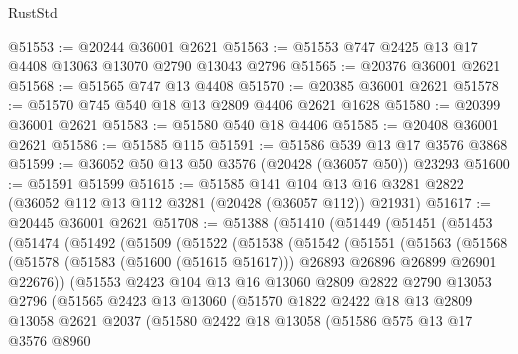 \begin{lexlean}{RustStd}
\begin{coremodule}
@51553 := @20244 @36001 @2621
@51563 := @51553 @747 @2425 @13 @17 @4408 @13063 @13070 @2790 @13043 @2796
@51565 := @20376 @36001 @2621
@51568 := @51565 @747 @13 @4408
@51570 := @20385 @36001 @2621
@51578 := @51570 @745 @540 @18 @13 @2809 @4406 @2621 @1628
@51580 := @20399 @36001 @2621
@51583 := @51580 @540 @18 @4406
@51585 := @20408 @36001 @2621
@51586 := @51585 @115
@51591 := @51586 @539 @13 @17 @3576 @3868
@51599 := @36052 @50 @13 @50 @3576 (@20428 (@36057 @50)) @23293
@51600 := @51591 @51599
@51615 := @51585
    @141
    @104
    @13
    @16
    @3281
    @2822
    (@36052 @112 @13 @112 @3281 (@20428 (@36057 @112)) @21931)
@51617 := @20445 @36001 @2621
@51708 := @51388
    (@51410
      (@51449
        (@51451
          (@51453
            (@51474
              (@51492
                (@51509
                  (@51522
                    (@51538
                      (@51542
                        (@51551
                          (@51563
                            (@51568
                              (@51578
                                (@51583 (@51600 (@51615 @51617)))
                                @26893
                                @26896
                                @26899
                                @26901
                                @22676))
                            (@51553
                              @2423
                              @104
                              @13
                              @16
                              @13060
                              @2809
                              @2822
                              @2790
                              @13053
                              @2796
                              (@51565
                                @2423
                                @13
                                @13060
                                (@51570
                                  @1822
                                  @2422
                                  @18
                                  @13
                                  @2809
                                  @13058
                                  @2621
                                  @2037
                                  (@51580
                                    @2422
                                    @18
                                    @13058
                                    (@51586
                                      @575
                                      @13
                                      @17
                                      @3576
                                      @8960

\end{coremodule}
\end{lexlean}
